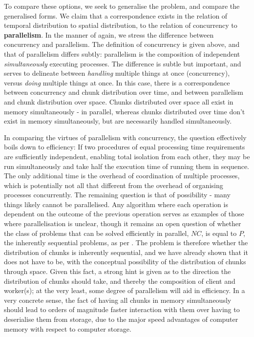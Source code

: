 To compare these options, we seek to generalise the problem, and compare the generalised forms.
We claim that a correspondence exists in the relation of temporal distribution to spatial distribution, to the relation of concurrency to \textbf{parallelism}.
In the manner of \textcite{pike2012concurrency} again, we stress the difference between concurrency and parallelism.
The definition of concurrency is given above, and that of parallelism differs subtly: parallelism is the composition of independent \emph{simultaneously} executing processes.
The difference is subtle but important, and serves to delineate between \emph{handling} multiple things at once (concurrency), versus \emph{doing} multiple things at once.
In this case, there is a correspondence between concurrency and chunk distribution over time, and between parallelism and chunk distribution over space.
Chunks distributed over space all exist in memory simultaneously - in parallel, whereas chunks distributed over time don't exist in memory simultaneously, but are necessarily handled simultaneously.

In comparing the virtues of parallelism with concurrency, the question effectively boils down to efficiency: If two procedures of equal processing time requirements are sufficiently independent, enabling total isolation from each other, they may be run simultaneously and take half the execution time of running them in sequence.
The only additional time is the overhead of coordination of multiple processes, which is potentially not all that different from the overhead of organising processes concurrently.
The remaining question is that of possibility - many things likely cannot be parallelised.
Any algorithm where each operation is dependent on the outcome of the previous operation serves as examples of those where parallelisation is unclear, though it remains an open question of whether the class of problems that can be solved efficiently in parallel, \(NC\), is equal to \(P\), the inherently sequential problems, as per \textcite{cook1985}.
The problem is therefore whether the distribution of chunks is inherently sequential, and we have already shown that it does not have to be, with the conceptual possibility of the distribution of chunks through space.
Given this fact, a strong hint is given as to the direction the distribution of chunks should take, and thereby the composition of client and worker(s); at the very least, some degree of parallelism will aid in efficiency.
In a very concrete sense, the fact of having all chunks in memory simultaneously should lead to orders of magnitude faster interaction with them over having to deserialise them from storage, due to the major speed advantages of computer memory with respect to computer storage.

